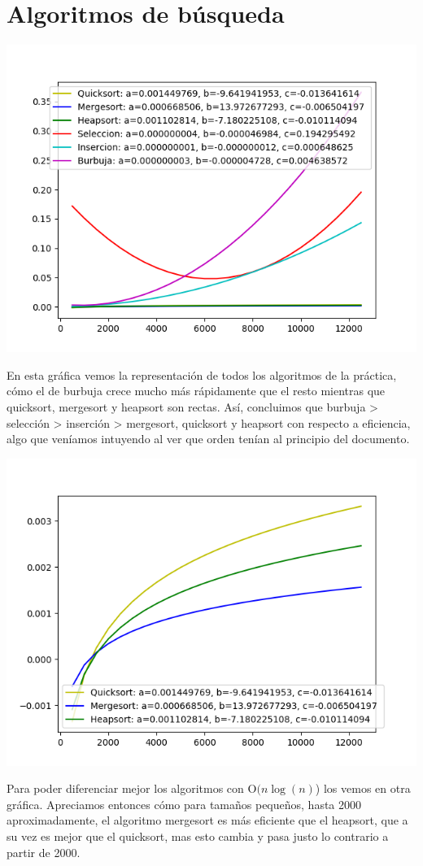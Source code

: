 \section{Algoritmos de búsqueda}
\begin{center}
\includegraphics[scale=0.6]{../graficos/ordenacion/ordenacion.png}
\end{center}
En esta gráfica vemos la representación de todos los algoritmos de la práctica, cómo el de burbuja crece mucho más rápidamente que el resto mientras que quicksort, mergesort y heapsort son rectas. Así, concluimos que burbuja > selección > inserción > mergesort, quicksort y heapsort con respecto a eficiencia, algo que veníamos intuyendo al ver que orden tenían al principio del documento.

\begin{center}
\includegraphics[scale=0.5]{../graficos/ordenacion/ordenacion_sort_only.png}
\end{center}
Para poder diferenciar mejor los algoritmos con O$(n\log(n)$) los vemos en otra gráfica. Apreciamos entonces cómo para tamaños pequeños, hasta 2000 aproximadamente, el algoritmo mergesort es más eficiente que el heapsort, que a su vez es mejor que el quicksort, mas esto cambia y pasa justo lo contrario a partir de 2000.


